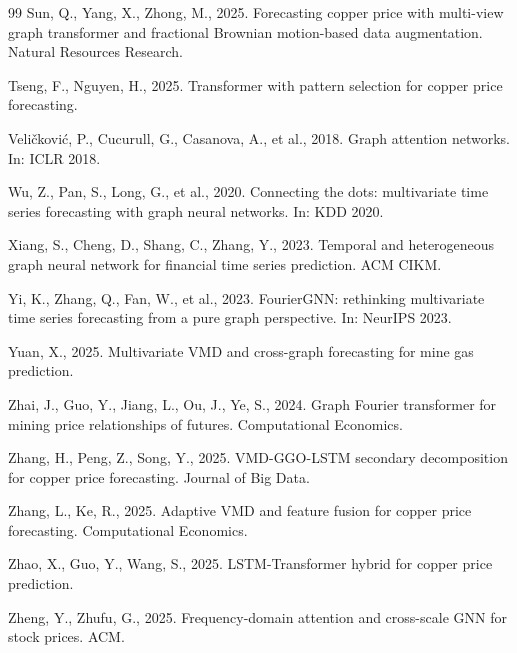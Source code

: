 \documentclass[journal]{IEEEtran}
\begin{document}
\begin{thebibliography}{99}
Sun, Q., Yang, X., Zhong, M., 2025. Forecasting copper price with multi-view graph transformer and fractional Brownian motion-based data augmentation. Natural Resources Research.

Tseng, F., Nguyen, H., 2025. Transformer with pattern selection for copper price forecasting.

Veli\v{c}kovi\'{c}, P., Cucurull, G., Casanova, A., et al., 2018. Graph attention networks. In: ICLR 2018.

Wu, Z., Pan, S., Long, G., et al., 2020. Connecting the dots: multivariate time series forecasting with graph neural networks. In: KDD 2020.

Xiang, S., Cheng, D., Shang, C., Zhang, Y., 2023. Temporal and heterogeneous graph neural network for financial time series prediction. ACM CIKM.

Yi, K., Zhang, Q., Fan, W., et al., 2023. FourierGNN: rethinking multivariate time series forecasting from a pure graph perspective. In: NeurIPS 2023.

Yuan, X., 2025. Multivariate VMD and cross-graph forecasting for mine gas prediction.

Zhai, J., Guo, Y., Jiang, L., Ou, J., Ye, S., 2024. Graph Fourier transformer for mining price relationships of futures. Computational Economics.

Zhang, H., Peng, Z., Song, Y., 2025. VMD-GGO-LSTM secondary decomposition for copper price forecasting. Journal of Big Data.

Zhang, L., Ke, R., 2025. Adaptive VMD and feature fusion for copper price forecasting. Computational Economics.

Zhao, X., Guo, Y., Wang, S., 2025. LSTM-Transformer hybrid for copper price prediction.

Zheng, Y., Zhufu, G., 2025. Frequency-domain attention and cross-scale GNN for stock prices. ACM.

\end{thebibliography}
\end{document}
